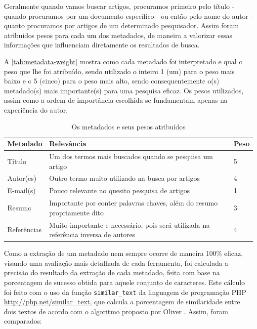 
Geralmente quando vamos buscar artigos, procuramos primeiro pelo título - quando procuramos por um documento específico - ou então pelo nome do autor - quanto procuramos por artigos de um determinado pesquisador. Assim foram atribuídos pesos para cada um dos metadados, de maneira a valorizar essas informações que influenciam diretamente os resultados de busca.

A \autoref{tab:metadata-weight} mostra como cada metadado foi interpretado e qual o peso que lhe foi atribuído, sendo utilizado o inteiro 1 (um) para o peso mais baixo e o 5 (cinco) para o peso mais alto, sendo consequentemente o(s) metadado(s) mais importante(s) para uma pesquisa eficaz. Os pesos utilizados, assim como a ordem de importância escolhida se fundamentam apenas na experiência do autor.


\begin{table}[h!]
    \caption{Os metadados e seus pesos atribuídos}
    \begin{center}
        \begin{tabular}{|p{3cm}|p{8cm}|C{1cm}|}
            \hline \textbf{Metadado} & \textbf{Relevância} & \textbf{Peso} \\ 
            \hline Título & Um dos termos mais buscados quando se pesquisa um artigo & 5 \\
            \hline Autor(es) & Outro termo muito utilizado na busca por artigos & 4 \\
            \hline E-mail(s) & Pouco relevante no quesito pesquisa de artigos & 1 \\
            \hline Resumo & Importante por conter palavras chaves, além do resumo propriamente dito & 3 \\
            \hline Referências & Muito importante e necessário, pois será utilizada na referência inversa de autores & 4 \\
            \hline 
        \end{tabular} 
    \end{center}
    \label{tab:metadata-weight}
\end{table}

Como a extração de um metadado nem sempre ocorre de maneira 100\% eficaz, visando uma avaliação mais detalhada de cada ferramenta, foi calculada a precisão do resultado da extração de cada metadado, feita com base na porcentagem de sucesso obtida para aquele conjunto de caracteres. Este cálculo foi feito com o uso da função \texttt{similar\_text} da linguagem de programação PHP \url{http://php.net/similar_text}, que calcula a porcentagem de similaridade entre dois textos de acordo com o algoritmo proposto por Oliver \cite{oliver-1993}. Assim, foram comparados:

